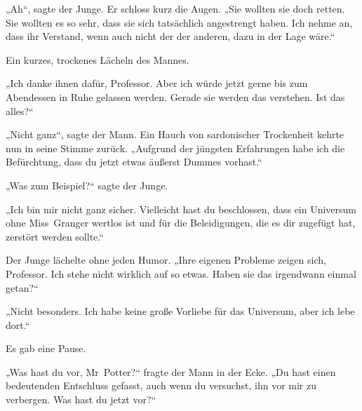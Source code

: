 „Ah“, sagte der Junge. Er schloss kurz die Augen.
„Sie wollten sie doch retten. Sie wollten es so sehr, dass sie sich tatsächlich angestrengt haben. Ich nehme an, dass ihr Verstand, wenn auch nicht der der anderen, dazu in der Lage wäre.“

Ein kurzes, trockenes Lächeln des Mannes.

„Ich danke ihnen dafür, Professor. Aber ich würde jetzt gerne bis zum Abendessen in Ruhe gelassen werden. Gerade sie werden das verstehen. Ist das alles?“

„Nicht ganz“, sagte der Mann. Ein Hauch von sardonischer Trockenheit kehrte nun in seine Stimme zurück.
„Aufgrund der jüngsten Erfahrungen habe ich die Befürchtung, dass du jetzt etwas äußerst Dummes vorhast.“

„Was zum Beispiel?“ sagte der Junge.

„Ich bin mir nicht ganz sicher. Vielleicht hast du beschlossen, dass ein Universum ohne Miss~Granger wertlos ist und für die Beleidigungen, die es dir zugefügt hat, zerstört werden sollte.“

Der Junge lächelte ohne jeden Humor.
„Ihre eigenen Probleme zeigen sich, Professor. Ich stehe nicht wirklich auf so etwas. Haben sie das irgendwann einmal getan?“

„Nicht besonders. Ich habe keine große Vorliebe für das Universum, aber ich lebe dort.“

Es gab eine Pause.

„Was hast du vor, Mr~Potter?“ fragte der Mann in der Ecke.
„Du hast einen bedeutenden Entschluss gefasst, auch wenn du versuchst, ihn vor mir zu verbergen. Was hast du jetzt vor?“

